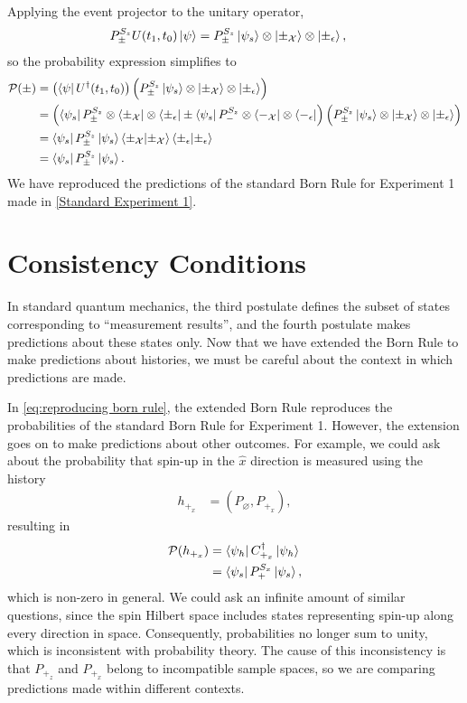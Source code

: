 Applying the event projector to the unitary operator,
\begin{align}
  P^{S_z}_\pm U(t_1, t_0) \ket{\psi} &= P^{S_z}_\pm \ket{\psi_s} \otimes \ket{\pm_\mathcal{X}} \otimes \ket{\pm_\epsilon},
\end{align}
so the probability expression simplifies to
\begin{align} \label{eq:reproducing born rule}
  \mathcal{P}(\pm) &= \left(\bra{\psi}  U^\dagger(t_1, t_0)\right) \left( P^{S_z}_\pm \ket{\psi_s} \otimes \ket{\pm_\mathcal{X}} \otimes \ket{\pm_\epsilon}\right) \\ \nonumber
   &= \left(\bra{\psi_s}P^{S_z}_\pm \otimes \bra{\pm_\mathcal{X}} \otimes \bra{\pm_\epsilon} \pm \bra{\psi_s}P^{S_z}_- \otimes \bra{-_\mathcal{X}} \otimes \bra{-_\epsilon} \right) \left( P^{S_z}_\pm \ket{\psi_s} \otimes \ket{\pm_\mathcal{X}} \otimes \ket{\pm_\epsilon}\right) \\ \nonumber
   &= \bra{\psi_s} P^{S_z}_\pm \ket{\psi_s} \braket{\pm_\mathcal{X}|\pm_\mathcal{X}} \braket{\pm_\epsilon|\pm_\epsilon} \\ \nonumber
   &= \bra{\psi_s} P^{S_z}_\pm \ket{\psi_s}.
\end{align}
We have reproduced the predictions of the standard Born Rule for Experiment 1 made in \autoref{Standard Experiment 1}.

\section{Consistency Conditions} \label{sec:consistency conditions}

In standard quantum mechanics, the third postulate defines the subset of states corresponding to ``measurement results'', and the fourth postulate makes predictions about these states only. Now that we have extended the Born Rule to make predictions about histories, we must be careful about the context in which predictions are made.

In \autoref{eq:reproducing born rule}, the extended Born Rule reproduces the probabilities of the standard Born Rule for Experiment 1. However, the extension goes on to make predictions about other outcomes. For example, we could ask about the probability that spin-up in the $\hat{x}$ direction is measured using the history
\begin{align}
  h_{+_x} &= (P_\varnothing ,P_{+_x}),
\end{align}
resulting in
\begin{align}
  \mathcal{P}(h_{+_x}) &= \bra{\psi_h} C^\dagger_{+_x} \ket{\psi_h}  \\ \nonumber
  &= \bra{\psi_s} P^{S_x}_+ \ket{\psi_s},
\end{align}
which is non-zero in general. We could ask an infinite amount of similar questions, since the spin Hilbert space includes states representing spin-up along every direction in space. Consequently, probabilities no longer sum to unity, which is inconsistent with probability theory. The cause of this inconsistency is that $P_{+_z}$ and $P_{+_x}$ belong to incompatible sample spaces, so we are comparing predictions made within different contexts.

